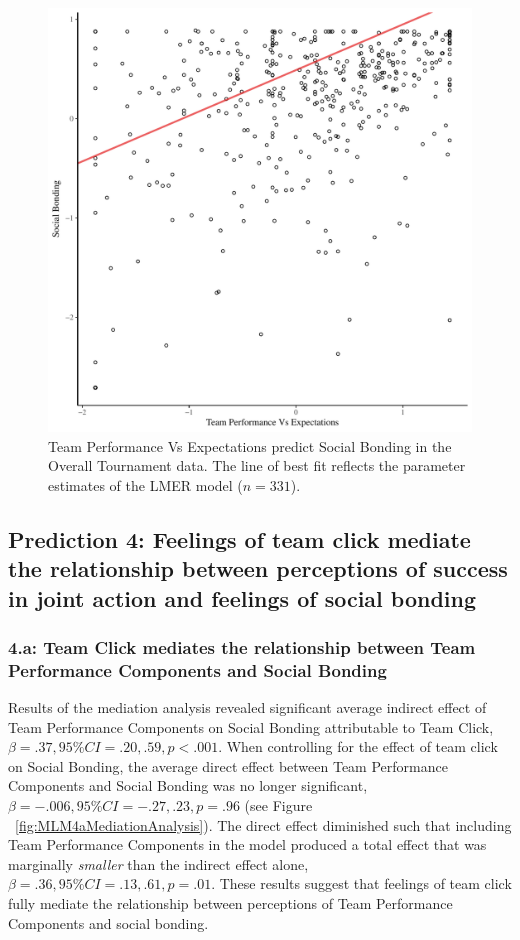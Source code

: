 \begin{CJK}{UTF8}{gbsn}
   \begin{figure}[htbp]
     \centering
   \includegraphics[scale=.5]{images/teamPerfBondOverallModelSlope.pdf}
     \caption{Team Performance Vs Expectations predict Social Bonding in the Overall Tournament data. The line of best fit reflects the parameter estimates of the LMER model ($n = 331$).}
     \label{fig:teamPerfBondOverallModelSlope}
   \end{figure}



\subsection{Prediction 4: Feelings of team click mediate the relationship between perceptions of success in joint action and feelings of social bonding}

  \subsubsection{4.a: Team Click mediates the relationship between Team Performance Components and Social Bonding}

  Results of the mediation analysis revealed significant average indirect effect of Team Performance Components on Social Bonding attributable to Team Click, $\beta = .37, 95\% CI = .20 , .59, p < .001$.  When controlling for the effect of team click on Social Bonding, the average direct effect between Team Performance Components and Social Bonding was no longer significant, $\beta = -.006, 95\% CI = -.27 , .23, p = .96 $ (see Figure ~\ref{fig:MLM4aMediationAnalysis}). The direct effect diminished such that including Team Performance Components in the model produced a total effect that was marginally \textit{smaller} than the indirect effect alone, $\beta = .36, 95\% CI = .13 , .61, p = .01$. These results suggest that feelings of team click fully mediate the relationship between perceptions of Team Performance Components and social bonding.



\end{CJK}
